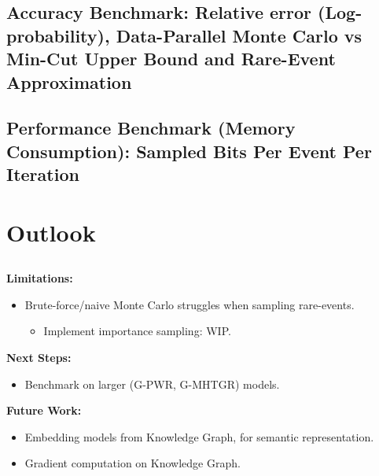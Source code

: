 \subsection{Accuracy Benchmark: Relative error (Log-probability), Data-Parallel Monte Carlo vs Min-Cut Upper Bound and Rare-Event Approximation}
\begin{frame}
    \begin{figure}[p]
        \centering
        
    \end{figure}
\end{frame}


\subsection{Performance Benchmark (Memory Consumption): Sampled Bits Per Event Per Iteration}
\begin{frame}
  \begin{multicols}{2}
    \begin{figure}[p]
        \centering
        
    \end{figure}
    \begin{figure}[p]
        \centering
        
    \end{figure}
  \end{multicols}

\end{frame}



\section{Outlook}
\subsection{}
\begin{frame}
  \textbf{Limitations:}
  \begin{itemize}
      \item {Brute-force/naive Monte Carlo struggles when sampling rare-events.}
        \begin{itemize}
          \item{Implement importance sampling: WIP.}
        \end{itemize}
  \end{itemize}\par
  \vfill
  \textbf{Next Steps:}
  \begin{itemize}
      \item {Benchmark on larger (G-PWR, G-MHTGR) models.}
  \end{itemize}\par
  \vfill
  \textbf{Future Work:}
  \begin{itemize}
      \item {Embedding models from Knowledge Graph, for semantic representation.}
      \item {Gradient computation on Knowledge Graph.}
  \end{itemize}\par
\end{frame}